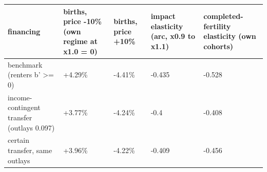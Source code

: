 \begingroup\small
\setlength{\tabcolsep}{3pt}
\renewcommand{\arraystretch}{1.04}
\begin{tabularx}{\linewidth}{XXXXX}
\toprule
financing & births, price -10\% (own regime at x1.0 = 0) & births, price +10\% & impact elasticity (arc, x0.9 to x1.1) & completed-fertility elasticity (own cohorts) \\
\midrule
benchmark (renters b' \textgreater{}= 0) & +4.29\% & -4.41\% & -0.435 & -0.528 \\
income-contingent transfer (outlays 0.097) & +3.77\% & -4.24\% & -0.4 & -0.408 \\
certain transfer, same outlays & +3.96\% & -4.22\% & -0.409 & -0.456 \\
\bottomrule
\end{tabularx}
\endgroup
